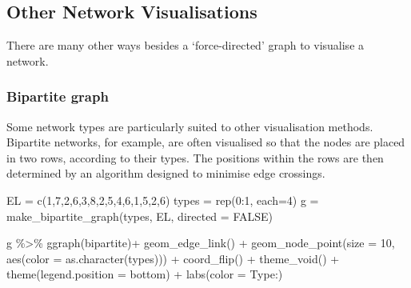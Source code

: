 \documentclass[
]{book}
\newenvironment{Shaded}{\begin{snugshade}}{\end{snugshade}}
\newcommand{\AttributeTok}[1]{\textcolor[rgb]{0.77,0.63,0.00}{#1}}
\newcommand{\ConstantTok}[1]{\textcolor[rgb]{0.00,0.00,0.00}{#1}}
\newcommand{\DecValTok}[1]{\textcolor[rgb]{0.00,0.00,0.81}{#1}}
\newcommand{\FunctionTok}[1]{\textcolor[rgb]{0.00,0.00,0.00}{#1}}
\newcommand{\NormalTok}[1]{#1}
\newcommand{\OtherTok}[1]{\textcolor[rgb]{0.56,0.35,0.01}{#1}}
\newcommand{\SpecialCharTok}[1]{\textcolor[rgb]{0.00,0.00,0.00}{#1}}
\newcommand{\StringTok}[1]{\textcolor[rgb]{0.31,0.60,0.02}{#1}}
\begin{document}
\hypertarget{other-network-visualisations}{%
\subsection{Other Network Visualisations}\label{other-network-visualisations}}

There are many other ways besides a `force-directed' graph to visualise a network.

\hypertarget{bipartite-graph}{%
\subsubsection{Bipartite graph}\label{bipartite-graph}}

Some network types are particularly suited to other visualisation methods. Bipartite networks, for example, are often visualised so that the nodes are placed in two rows, according to their types. The positions within the rows are then determined by an algorithm designed to minimise edge crossings.

\begin{Shaded}
\begin{Highlighting}[]
\NormalTok{EL }\OtherTok{=} \FunctionTok{c}\NormalTok{(}\DecValTok{1}\NormalTok{,}\DecValTok{7}\NormalTok{,}\DecValTok{2}\NormalTok{,}\DecValTok{6}\NormalTok{,}\DecValTok{3}\NormalTok{,}\DecValTok{8}\NormalTok{,}\DecValTok{2}\NormalTok{,}\DecValTok{5}\NormalTok{,}\DecValTok{4}\NormalTok{,}\DecValTok{6}\NormalTok{,}\DecValTok{1}\NormalTok{,}\DecValTok{5}\NormalTok{,}\DecValTok{2}\NormalTok{,}\DecValTok{6}\NormalTok{)}
\NormalTok{types }\OtherTok{=} \FunctionTok{rep}\NormalTok{(}\DecValTok{0}\SpecialCharTok{:}\DecValTok{1}\NormalTok{, }\AttributeTok{each=}\DecValTok{4}\NormalTok{)}
\NormalTok{g }\OtherTok{=} \FunctionTok{make\_bipartite\_graph}\NormalTok{(types, EL, }\AttributeTok{directed =} \ConstantTok{FALSE}\NormalTok{)}

\NormalTok{g }\SpecialCharTok{\%\textgreater{}\%} \FunctionTok{ggraph}\NormalTok{(}\StringTok{\textquotesingle{}bipartite\textquotesingle{}}\NormalTok{)}\SpecialCharTok{+} 
  \FunctionTok{geom\_edge\_link}\NormalTok{() }\SpecialCharTok{+} 
  \FunctionTok{geom\_node\_point}\NormalTok{(}\AttributeTok{size =} \DecValTok{10}\NormalTok{, }\FunctionTok{aes}\NormalTok{(}\AttributeTok{color =} \FunctionTok{as.character}\NormalTok{(types)))  }\SpecialCharTok{+} \FunctionTok{coord\_flip}\NormalTok{() }\SpecialCharTok{+} \FunctionTok{theme\_void}\NormalTok{() }\SpecialCharTok{+} \FunctionTok{theme}\NormalTok{(}\AttributeTok{legend.position =} \StringTok{\textquotesingle{}bottom\textquotesingle{}}\NormalTok{) }\SpecialCharTok{+} \FunctionTok{labs}\NormalTok{(}\AttributeTok{color =} \StringTok{\textquotesingle{}Type:\textquotesingle{}}\NormalTok{)}
\end{Highlighting}
\end{Shaded}
\end{document}
